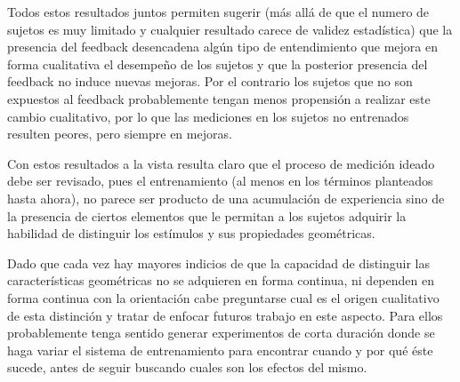 \documentclass{article}
\numberwithin{figure}{section}
\begin{document}
    Todos estos resultados juntos permiten sugerir (más allá de que el numero de sujetos es muy limitado y cualquier resultado carece de validez estadística) que la presencia del feedback desencadena algún tipo de entendimiento que mejora en forma cualitativa el desempeño de los sujetos y que la posterior presencia del feedback no induce nuevas mejoras. Por el contrario los sujetos que no son expuestos al feedback probablemente tengan menos propensión a realizar este cambio cualitativo, por lo que las mediciones en los sujetos no entrenados resulten peores, pero siempre en mejoras. 
    
    Con estos resultados a la vista resulta claro que el proceso de medición ideado debe ser revisado, pues el entrenamiento (al menos en los términos planteados hasta ahora), no parece ser producto de una acumulación de experiencia sino de la presencia de ciertos elementos que le permitan a los sujetos adquirir la habilidad de distinguir los estímulos y sus propiedades geométricas. 
    
    Dado que cada vez hay mayores indicios de que la capacidad de distinguir las características geométricas no se adquieren en forma continua, ni dependen en forma continua con la orientación cabe preguntarse cual es el origen cualitativo de esta distinción y tratar de enfocar futuros trabajo en este aspecto. Para ellos probablemente tenga sentido generar experimentos de corta duración donde se haga variar el sistema de entrenamiento para encontrar cuando y por qué éste sucede, antes de seguir buscando cuales son los efectos del mismo.
    
    
    
    
    
    
    
    

    
    
    
    

\clearpage
\end{document}
